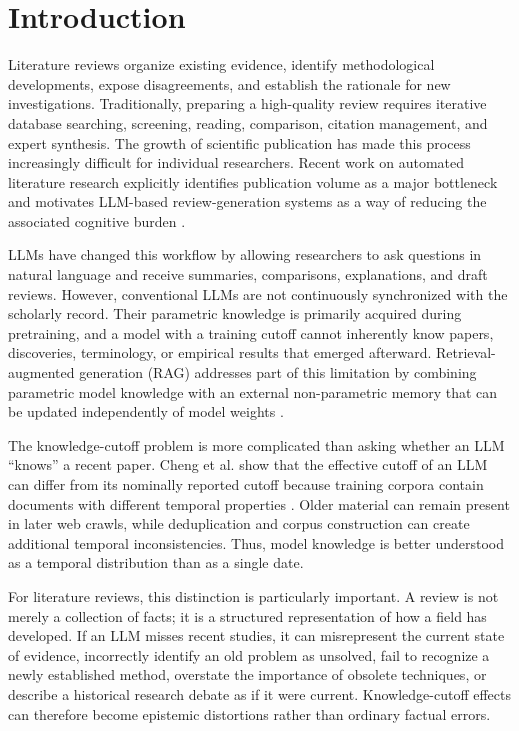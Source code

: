 \documentclass[manuscript,screen]{acmart}
\begin{document}
\section{Introduction}\label{sec:introduction}
Literature reviews organize existing evidence, identify methodological developments, expose disagreements,
and establish the rationale for new investigations. Traditionally, preparing a high-quality review requires
iterative database searching, screening, reading, comparison, citation management, and expert synthesis.
The growth of scientific publication has made this process increasingly difficult for individual researchers.
Recent work on automated literature research explicitly identifies publication volume as a major bottleneck
and motivates LLM-based review-generation systems as a way of reducing the associated cognitive burden
\cite{wu2025}.

LLMs have changed this workflow by allowing researchers to ask questions in natural language and receive
summaries, comparisons, explanations, and draft reviews. However, conventional LLMs are not continuously
synchronized with the scholarly record. Their parametric knowledge is primarily acquired during pretraining,
and a model with a training cutoff cannot inherently know papers, discoveries, terminology, or empirical
results that emerged afterward. Retrieval-augmented generation (RAG) addresses part of this limitation by
combining parametric model knowledge with an external non-parametric memory that can be updated
independently of model weights \cite{lewis2020}.

The knowledge-cutoff problem is more complicated than asking whether an LLM ``knows'' a recent paper.
Cheng et al. show that the effective cutoff of an LLM can differ from its nominally reported cutoff because
training corpora contain documents with different temporal properties \cite{cheng2024}. Older material can
remain present in later web crawls, while deduplication and corpus construction can create additional temporal
inconsistencies. Thus, model knowledge is better understood as a temporal distribution than as a single date.

For literature reviews, this distinction is particularly important. A review is not merely a collection of
facts; it is a structured representation of how a field has developed. If an LLM misses recent studies, it can
misrepresent the current state of evidence, incorrectly identify an old problem as unsolved, fail to recognize a
newly established method, overstate the importance of obsolete techniques, or describe a historical research
debate as if it were current. Knowledge-cutoff effects can therefore become epistemic distortions rather than
ordinary factual errors.
\end{document}
